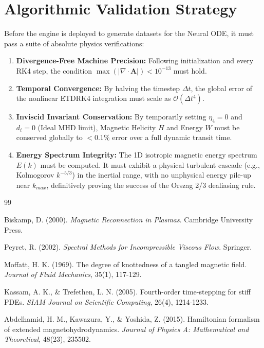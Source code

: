 \documentclass[11pt, a4paper]{article}
\begin{document}
\section{Algorithmic Validation Strategy}
\label{sec:validation}
Before the engine is deployed to generate datasets for the Neural ODE, it must pass a suite of absolute physics verifications:
\begin{enumerate}
    \item \textbf{Divergence-Free Machine Precision:} Following initialization and every RK4 step, the condition $\max(|\nabla \cdot \mathbf{A}|) < 10^{-13}$ must hold.
    \item \textbf{Temporal Convergence:} By halving the timestep $\Delta t$, the global error of the nonlinear ETDRK4 integration must scale as $\mathcal{O}(\Delta t^4)$.
    \item \textbf{Inviscid Invariant Conservation:} By temporarily setting $\eta_4 = 0$ and $d_i=0$ (Ideal MHD limit), Magnetic Helicity $H$ and Energy $W$ must be conserved globally to $<0.1\%$ error over a full dynamic transit time.
    \item \textbf{Energy Spectrum Integrity:} The 1D isotropic magnetic energy spectrum $E(k)$ must be computed. It must exhibit a physical turbulent cascade (e.g., Kolmogorov $k^{-5/3}$) in the inertial range, with no unphysical energy pile-up near $k_{max}$, definitively proving the success of the Orszag 2/3 dealiasing rule.
\end{enumerate}

\newpage
\begin{thebibliography}{99}

Biskamp, D. (2000). \textit{Magnetic Reconnection in Plasmas}. Cambridge University Press.

Peyret, R. (2002). \textit{Spectral Methods for Incompressible Viscous Flow}. Springer.

Moffatt, H. K. (1969). The degree of knottedness of a tangled magnetic field. \textit{Journal of Fluid Mechanics}, 35(1), 117-129.

Kassam, A. K., \& Trefethen, L. N. (2005). Fourth-order time-stepping for stiff PDEs. \textit{SIAM Journal on Scientific Computing}, 26(4), 1214-1233.

Abdelhamid, H. M., Kawazura, Y., \& Yoshida, Z. (2015). Hamiltonian formalism of extended magnetohydrodynamics. \textit{Journal of Physics A: Mathematical and Theoretical}, 48(23), 235502.

\end{thebibliography}
\end{document}
